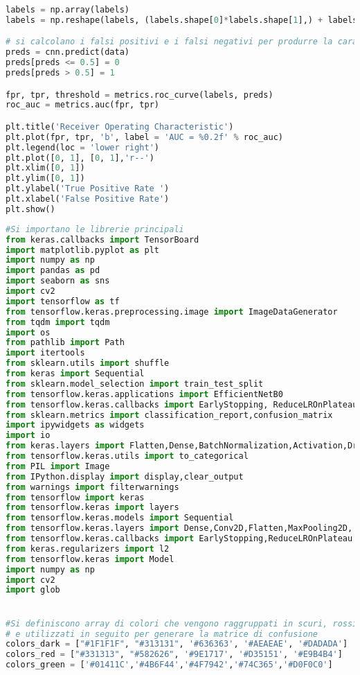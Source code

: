 \begin{lstlisting}[basicstyle=\tiny, language=Python, caption=Esempio di implementazione di una CNN per la classificazione di raggi-X.~\cite{dspneum} ]
labels = np.array(labels)
labels = np.reshape(labels, (labels.shape[0]*labels.shape[1],) + labels.shape[2:])

# si calcolano i falsi positivi e i falsi negativi per produrre la caratteristica ROC
preds = cnn.predict(data)
preds[preds <= 0.5] = 0
preds[preds > 0.5] = 1

fpr, tpr, threshold = metrics.roc_curve(labels, preds)
roc_auc = metrics.auc(fpr, tpr)

plt.title('Receiver Operating Characteristic')
plt.plot(fpr, tpr, 'b', label = 'AUC = %0.2f' % roc_auc)
plt.legend(loc = 'lower right')
plt.plot([0, 1], [0, 1],'r--')
plt.xlim([0, 1])
plt.ylim([0, 1])
plt.ylabel('True Positive Rate ')
plt.xlabel('False Positive Rate')
plt.show()
\end{lstlisting}


\begin{lstlisting}[basicstyle=\tiny, language=Python, caption=Esempio di implementazione di AlexNet per la classificazione di RM con l'aggiunta di rumore al set di training.~\cite{dsbrain} ]
#Si importano le librerie principali
from keras.callbacks import TensorBoard
import matplotlib.pyplot as plt
import numpy as np
import pandas as pd
import seaborn as sns
import cv2
import tensorflow as tf
from tensorflow.keras.preprocessing.image import ImageDataGenerator
from tqdm import tqdm
import os
from pathlib import Path
import itertools
from sklearn.utils import shuffle
from keras import Sequential
from sklearn.model_selection import train_test_split
from tensorflow.keras.applications import EfficientNetB0
from tensorflow.keras.callbacks import EarlyStopping, ReduceLROnPlateau, TensorBoard, ModelCheckpoint
from sklearn.metrics import classification_report,confusion_matrix
import ipywidgets as widgets
import io
from keras.layers import Flatten,Dense,BatchNormalization,Activation,Dropout
from tensorflow.keras.utils import to_categorical
from PIL import Image
from IPython.display import display,clear_output
from warnings import filterwarnings
from tensorflow import keras 
from tensorflow.keras import layers
from tensorflow.keras.models import Sequential
from tensorflow.keras.layers import Dense,Conv2D,Flatten,MaxPooling2D, Input
from tensorflow.keras.callbacks import EarlyStopping,ReduceLROnPlateau
from keras.regularizers import l2
from tensorflow.keras import Model
import numpy as np
import cv2
import glob 


#Si definiscono array di colori che vengono raggruppati in scuri, rossi e verdi
# e utilizzati in seguito per generare la matrice di confusione
colors_dark = ["#1F1F1F", "#313131", '#636363', '#AEAEAE', '#DADADA']
colors_red = ["#331313", "#582626", '#9E1717', '#D35151', '#E9B4B4']
colors_green = ['#01411C','#4B6F44','#4F7942','#74C365','#D0F0C0']


\end{lstlisting}
